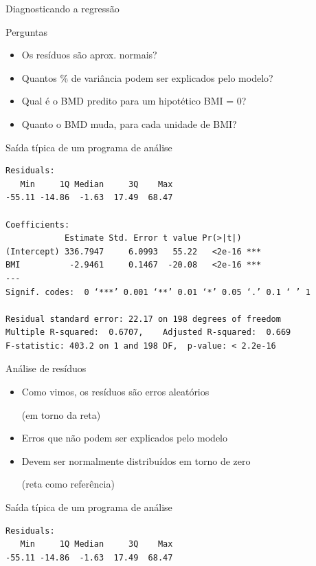 \documentclass{beamer}
\begin{document}
\begin{frame}[fragile]{Diagnosticando a regressão}
  \begin{block}{Perguntas}
    \begin{itemize}
      \footnotesize
    \item Os resíduos são aprox. normais?
    \item Quantos \% de variância podem ser explicados pelo modelo?
    \item Qual é o BMD predito para um hipotético BMI = 0?
    \item Quanto o BMD muda, para cada unidade de BMI?
    \end{itemize}
  \end{block}
  \begin{exampleblock}{Saída típica de um programa de análise}
    \tiny
\begin{verbatim}
Residuals:
   Min     1Q Median     3Q    Max
-55.11 -14.86  -1.63  17.49  68.47

Coefficients:
            Estimate Std. Error t value Pr(>|t|)    
(Intercept) 336.7947     6.0993   55.22   <2e-16 ***
BMI          -2.9461     0.1467  -20.08   <2e-16 ***
---
Signif. codes:  0 ‘***’ 0.001 ‘**’ 0.01 ‘*’ 0.05 ‘.’ 0.1 ‘ ’ 1

Residual standard error: 22.17 on 198 degrees of freedom
Multiple R-squared:  0.6707,	Adjusted R-squared:  0.669
F-statistic: 403.2 on 1 and 198 DF,  p-value: < 2.2e-16
\end{verbatim}
\end{exampleblock}
\end{frame}

\begin{frame}[fragile]{Análise de resíduos}
  \begin{itemize}
  \item Como vimos, os resíduos são erros aleatórios

    ({\footnotesize em torno da reta})
    \bigskip
  \item {\small Erros que não podem ser explicados pelo modelo}
    \bigskip

  \item Devem ser normalmente distribuídos em torno de zero

    ({\footnotesize reta como referência})
  \end{itemize}
  \vfill
  \begin{exampleblock}{Saída típica de um programa de análise}
    \footnotesize
\begin{verbatim}
Residuals:
   Min     1Q Median     3Q    Max
-55.11 -14.86  -1.63  17.49  68.47
\end{verbatim}
  \end{exampleblock}
\end{frame}
\end{document}

